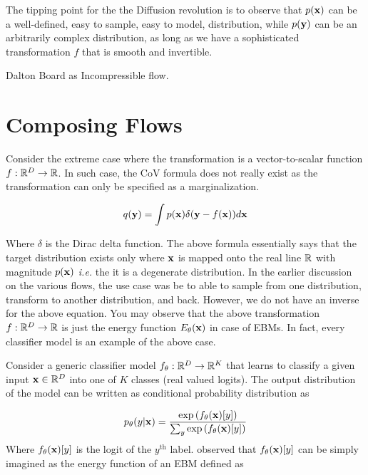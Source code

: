 \documentclass[a4paper, 11pt]{article}
\begin{document}
The tipping point for the the Diffusion revolution is to observe that $p(\mbox{$\mbox{$\mathbf{x}$}$})$ can be a well-defined, easy to sample, easy to model, distribution, while $p(\mbox{$\mbox{$\mathbf{y}$}$})$ can be an arbitrarily complex distribution, as long as we have a sophisticated transformation $f$ that is smooth and invertible.


Dalton Board as Incompressible flow.

\section{Composing Flows}
Consider the extreme case where the transformation is a vector-to-scalar function $f: \mathbb{R}^D \to \mathbb{R}$. In such case, the CoV formula does not really exist as the transformation can only be specified as a marginalization.

\begin{align} \label{eq:extreme_case}
    q(\mbox{$\mbox{$\mathbf{y}$}$}) = \int p(\mbox{$\mbox{$\mathbf{x}$}$}) \delta (\mbox{$\mbox{$\mathbf{y}$}$} - f(\mbox{$\mbox{$\mathbf{x}$}$})) d\mbox{$\mbox{$\mathbf{x}$}$}
\end{align}

Where $\delta$ is the Dirac delta function. The above formula essentially says that the target distribution exists only where $\mbox{$\mbox{$\mathbf{x}$}$}$ is mapped onto the real line $\mathbb{R}$ with magnitude $p(\mbox{$\mbox{$\mathbf{x}$}$})$ \textit{i.e.} the it is a degenerate distribution. In the earlier discussion on the various flows, the use case was be to able to sample from one distribution, transform to another distribution, and back. However, we do not have an inverse for the above equation.
You may observe that the above transformation $f: \mathbb{R}^D \to \mathbb{R}$ is just the energy function $E_\theta(\mbox{$\mbox{$\mathbf{x}$}$})$ in case of EBMs. In fact, every classifier model is an example of the above case.

Consider a generic classifier model $f_\theta: \mathbb{R}^D \to \mathbb{R}^K$ that learns to classify a given input $\mbox{$\mbox{$\mathbf{x}$}$} \in \mathbb{R}^D$ into one of $K$ classes (real valued logits). The output distribution of the model can be written as conditional probability distribution as

\begin{align}
    p_\theta(y | \mbox{$\mbox{$\mathbf{x}$}$}) = \frac{\exp\left (f_\theta(\mbox{$\mbox{$\mathbf{x}$}$})[y]  \right )}{\sum_y \exp\left (f_\theta(\mbox{$\mbox{$\mathbf{x}$}$})[y]  \right )}
\end{align}
Where $f_\theta(\mbox{$\mbox{$\mathbf{x}$}$})[y]$ is the logit of the $y^{\text{th}}$ label. \cite{grathwohl2019your} observed that $f_\theta(\mbox{$\mbox{$\mathbf{x}$}$})[y]$ can be simply imagined as the energy function of an EBM defined as
\end{document}
